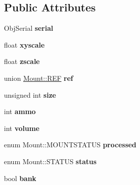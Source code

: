 \subsection*{Public Attributes}
\begin{DoxyCompactItemize}
\item 
Obj\+Serial {\bfseries serial}\hypertarget{classMount_aed60748f13012140c81c1b26f9f52b8b}{}\label{classMount_aed60748f13012140c81c1b26f9f52b8b}

\item 
float {\bfseries xyscale}\hypertarget{classMount_aa5b5a1f0d2213ab81e78ea5c36f392d6}{}\label{classMount_aa5b5a1f0d2213ab81e78ea5c36f392d6}

\item 
float {\bfseries zscale}\hypertarget{classMount_af2be64bcaab83abaa12dd97becc1c34e}{}\label{classMount_af2be64bcaab83abaa12dd97becc1c34e}

\item 
union \hyperlink{unionMount_1_1REF}{Mount\+::\+R\+EF} {\bfseries ref}\hypertarget{classMount_a1e1a4d37df3a135dd32bc78592d6300d}{}\label{classMount_a1e1a4d37df3a135dd32bc78592d6300d}

\item 
unsigned int {\bfseries size}\hypertarget{classMount_aea90805976c2a847ab4f0269ff4de3e7}{}\label{classMount_aea90805976c2a847ab4f0269ff4de3e7}

\item 
int {\bfseries ammo}\hypertarget{classMount_a38d65d224d018d86cc82aeab68353738}{}\label{classMount_a38d65d224d018d86cc82aeab68353738}

\item 
int {\bfseries volume}\hypertarget{classMount_a42dc7489340340f5832ceefb5f817b93}{}\label{classMount_a42dc7489340340f5832ceefb5f817b93}

\item 
enum Mount\+::\+M\+O\+U\+N\+T\+S\+T\+A\+T\+US {\bfseries processed}\hypertarget{classMount_a96f250319419143ea5c4e72c057c3285}{}\label{classMount_a96f250319419143ea5c4e72c057c3285}

\item 
enum Mount\+::\+S\+T\+A\+T\+US {\bfseries status}\hypertarget{classMount_ae3a614e61f6921e3705aa16af147f3a6}{}\label{classMount_ae3a614e61f6921e3705aa16af147f3a6}

\item 
bool {\bfseries bank}\hypertarget{classMount_a0354bc20a16743b46b3e8022e44364ca}{}\label{classMount_a0354bc20a16743b46b3e8022e44364ca}


\end{DoxyCompactItemize}
